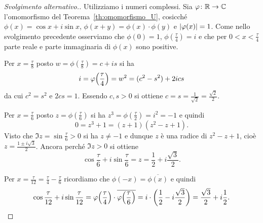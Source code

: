 \begin{proof}[Svolgimento alternativo.]
Utilizziamo i numeri complessi.
Sia $\varphi\colon{\mathbb R}\to{\mathbb C}$ l'omomorfismo del Teorema~\ref{th:omomorfismo_U},
cosicché $\phi(x) = \cos x + i \sin x$, 
$\phi(x+y) = \phi(x)\cdot\phi(y)$ e ${\left|\varphi(x)\right|}=1$.
Come nello svolgimento precedente osserviamo che 
$\phi(0)=1$, $\phi(\frac \tau 4)= i$ 
e che per $0<x<\frac \tau 4$ parte reale e parte immaginaria 
di $\phi(x)$ sono positive.

Per $x=\frac \tau 8$ posto $w = \phi(\frac \tau 8) = c + i s$ si ha
\[
  i = \varphi{\left( \frac \tau 4 \right)} = w^2 = (c^2-s^2) + 2 i cs
\]
da cui $c^2 = s^2$ e $2cs = 1$. 
Essendo $c,s>0$ si ottiene $c=s=\frac{1}{\sqrt 2}=\frac{\sqrt 2}2$.

Per $x=\frac \tau 6$ posto $z = \phi(\frac \tau 6)$
si ha $z^3 = \phi(\frac \tau 2) = i^2 = -1$ e quindi
\[
  0 = z^3 + 1 = (z+1)(z^2 - z + 1).
\]
Visto che $\Im z = \sin \frac \tau 6 >0$ si ha $z\neq -1$ 
e dunque $z$ è una radice di $z^2-z+1$, cioè $z = \frac{1\pm i\sqrt 3}{2}$.
Ancora perché $\Im z>0$ si ottiene
\[
  \cos \frac \tau 6 + i \sin \frac \tau 6 = z = \frac 1 2 + i\frac{\sqrt 3}2.
\]

Per $x=\frac \tau{12} = \frac \tau 4 - \frac \tau 6$ ricordiamo che 
$\phi(-x) = \overline{\phi(x)}$ e quindi
\[
  \cos \frac \tau{12} + i \sin \frac \tau{12}
  = \varphi{\left( \frac \tau 4 \right)}\cdot \overline{\varphi{\left( \frac \tau 6 \right)}}
  = i \cdot {\left( \frac 1 2 - i \frac{\sqrt 3}2 \right)}
  = \frac{\sqrt 3}2 + i\frac 1 2.
\]
\end{proof}